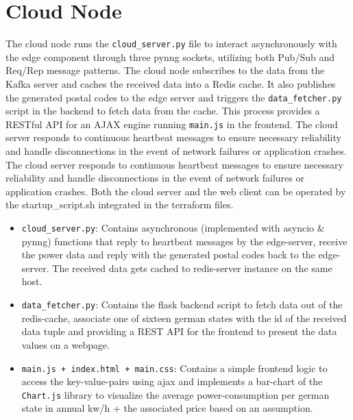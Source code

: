 \documentclass[a4paper]{article}
\begin{document}
\section{Cloud Node}

The cloud node runs the \texttt{cloud\_server.py} file to interact
asynchronously with the edge component through three pynng sockets, utilizing
both Pub/Sub and Req/Rep message patterns. The cloud node subscribes to the data
from the Kafka server and caches the received data into a Redis cache. It also
publishes the generated postal codes to the edge server and triggers the
\texttt{data\_fetcher.py} script in the backend to fetch data from the cache.
This process provides a RESTful API for an AJAX engine running \texttt{main.js}
in the frontend. The cloud server responds to continuous heartbeat messages to
ensure necessary reliability and handle disconnections in the event of network
failures or application crashes. The cloud server responds to continuous heartbeat
messages to ensure necessary reliability and handle disconnections in the event of 
network failures or application crashes. Both the cloud server and the web client can be operated by 
the startup_script.sh integrated in the terraform files.

\begin{itemize}

    \item \texttt{cloud\_server.py}: Contains asynchronous (implemented with
        asyncio \& pynng) functions that reply to heartbeat messages by the edge-server, receive
        the power data and reply with the generated postal codes back to the
        edge-server. The received data gets cached to redis-server instance on the
        same host.

    \item \texttt{data\_fetcher.py}: Contains the flask backend script to fetch
        data out of the redis-cache, associate one of sixteen german states with
        the id of the received data tuple and providing a REST API for the
        frontend to present the data values on a webpage.

    \item \texttt{main.js + index.html + main.css}: Contains a simple frontend
        logic to access the key-value-pairs using ajax and implements a
        bar-chart of the \texttt{Chart.js} library to visualize the average
        power-consumption per german state in annual kw/h + the associated price
        based on an assumption.

\end{itemize}



\end{document}

